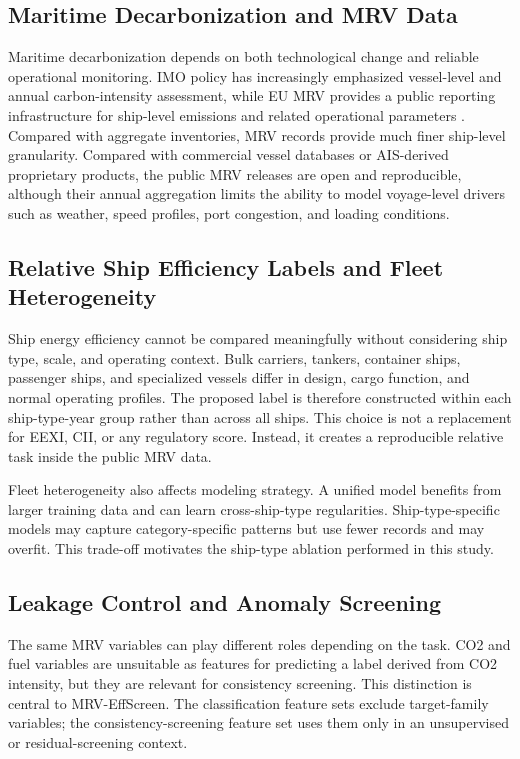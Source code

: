 \documentclass[jmse,article,submit,pdftex,oneauthor]{Definitions/mdpi}
\begin{document}
\subsection{Maritime Decarbonization and MRV Data}

Maritime decarbonization depends on both technological change and reliable operational monitoring. IMO policy has increasingly emphasized vessel-level and annual carbon-intensity assessment, while EU MRV provides a public reporting infrastructure for ship-level emissions and related operational parameters \cite{emsa_thetis_mrv,ec_2024_mrv_report,imo_2023_ghg_strategy}. Compared with aggregate inventories, MRV records provide much finer ship-level granularity. Compared with commercial vessel databases or AIS-derived proprietary products, the public MRV releases are open and reproducible, although their annual aggregation limits the ability to model voyage-level drivers such as weather, speed profiles, port congestion, and loading conditions.

\subsection{Relative Ship Efficiency Labels and Fleet Heterogeneity}

Ship energy efficiency cannot be compared meaningfully without considering ship type, scale, and operating context. Bulk carriers, tankers, container ships, passenger ships, and specialized vessels differ in design, cargo function, and normal operating profiles. The proposed label is therefore constructed within each ship-type-year group rather than across all ships. This choice is not a replacement for EEXI, CII, or any regulatory score. Instead, it creates a reproducible relative task inside the public MRV data.

Fleet heterogeneity also affects modeling strategy. A unified model benefits from larger training data and can learn cross-ship-type regularities. Ship-type-specific models may capture category-specific patterns but use fewer records and may overfit. This trade-off motivates the ship-type ablation performed in this study.

\subsection{Leakage Control and Anomaly Screening}

The same MRV variables can play different roles depending on the task. CO2 and fuel variables are unsuitable as features for predicting a label derived from CO2 intensity, but they are relevant for consistency screening. This distinction is central to MRV-EffScreen. The classification feature sets exclude target-family variables; the consistency-screening feature set uses them only in an unsupervised or residual-screening context.
\end{document}
